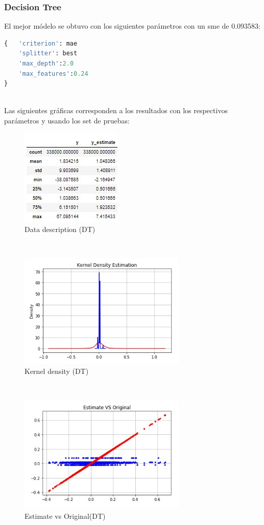 \subsubsection{Decision Tree}
El mejor m\'odelo se obtuvo con los siguientes par\'ametros con un sme de 0.093583:
\begin{lstlisting}[language=Python]
{	'criterion': mae		
	'splitter': best	
	'max_depth':2.0		
	'max_features':0.24
}\end{lstlisting}
\\
Las siguientes gr\'aficas corresponden a los resultados con los respectivos par\'ametros y usando los set de pruebas:
\begin{figure}[h!]
	\centering
	\includegraphics[width=0.3\linewidth]{Figure/dtr_decription.jpeg}
	\caption{Data description (DT)} 
	\label{fig:dt_ed}
\end{figure}
\\
\begin{figure}[h!]
	\centering
	\includegraphics[width=0.8\linewidth]{Figure/dtr_kerneldensity.jpeg}
	\caption{Kernel density (DT)} 
	\label{fig:dt_kd}
\end{figure}
\\
\begin{figure}[h!]
	\centering
	\includegraphics[width=0.8\linewidth]{Figure/dtr_estimorg.jpeg}
	\caption{Estimate vs Original(DT)} 
	\label{fig:dt_eo}
\end{figure}


